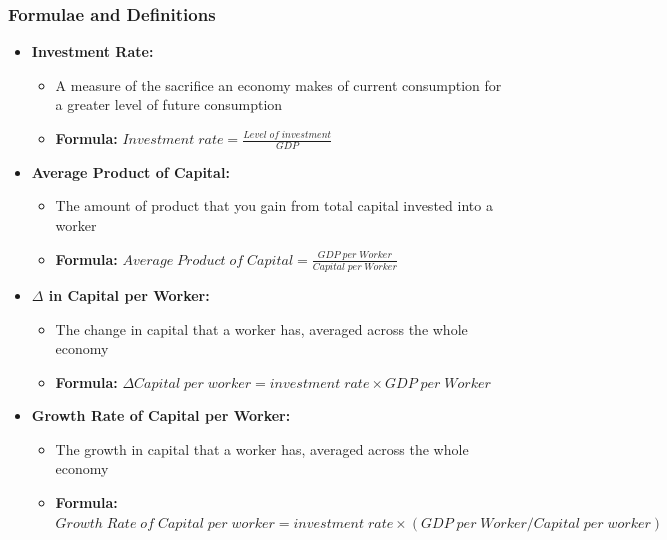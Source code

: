 \documentclass[12pt, letterpaper]{article}
\begin{document}
\subsubsection{Formulae and Definitions}
\begin{itemize}
	\item \textbf{Investment Rate:}
		\begin{itemize}
			\item A measure of the sacrifice an economy makes of current consumption for a greater level of future consumption
			\item \textbf{Formula:} $Investment\;rate = \frac{Level\;of\;investment}{GDP}$
		\end{itemize}
	\item \textbf{Average Product of Capital:}
		\begin{itemize}
			\item The amount of product that you gain from total capital invested into a worker
			\item \textbf{Formula:} $Average\;Product\;of\;Capital = \frac{GDP\;per\;Worker}{Capital\;per\;Worker}$
		\end{itemize}
	\item \textbf{$\Delta$ in Capital per Worker:}
		\begin{itemize}
			\item The change in capital that a worker has, averaged across the whole economy
			\item \textbf{Formula:} $\Delta Capital\;per\;worker = investment\; rate \times GDP\;per\;Worker$
		\end{itemize}
	\item \textbf{Growth Rate of Capital per Worker:}
		\begin{itemize}
			\item The growth in capital that a worker has, averaged across the whole economy
			\item \textbf{Formula:} $Growth\;Rate\;of\; Capital\;per\;worker = investment\; rate \times (GDP\;per\;Worker / Capital\;per\;worker)$
		\end{itemize}
		
\end{itemize}
\end{document}
